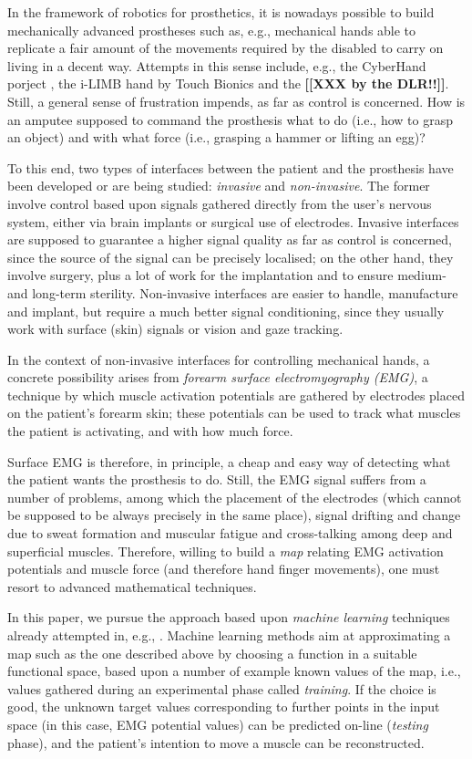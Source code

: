 In the framework of robotics for prosthetics, it is nowadays possible
to build mechanically advanced prostheses such as, e.g., mechanical
hands able to replicate a fair amount of the movements required by the
disabled to carry on living in a decent way. Attempts in this sense
include, e.g., the CyberHand porject \cite{...}, the i-LIMB hand by
Touch Bionics \cite{...} and the \textbf{[[XXX by the DLR!!]]}. Still,
a general sense of frustration impends, as far as control is
concerned. How is an amputee supposed to command the prosthesis what
to do (i.e., how to grasp an object) and with what force (i.e.,
grasping a hammer or lifting an egg)?

To this end, two types of interfaces between the patient and the
prosthesis have been developed or are being studied: \emph{invasive} and
\emph{non-invasive}. The former involve control based upon signals
gathered directly from the user's nervous system, either via brain
implants or surgical use of electrodes. Invasive interfaces are
supposed to guarantee a higher signal quality as far as control is
concerned, since the source of the signal can be precisely localised;
on the other hand, they involve surgery, plus a lot of work for the
implantation and to ensure medium- and long-term
sterility. Non-invasive interfaces are easier to handle, manufacture
and implant, but require a much better signal conditioning, since they
usually work with surface (skin) signals or vision and gaze
tracking.

In the context of non-invasive interfaces for controlling mechanical
hands, a concrete possibility arises from \emph{forearm surface
electromyography (EMG)}, a technique by which muscle activation
potentials are gathered by electrodes placed on the patient's forearm
skin; these potentials can be used to track what muscles the patient
is activating, and with how much force.

Surface EMG is therefore, in principle, a cheap and easy way of
detecting what the patient wants the prosthesis to do. Still, the EMG
signal suffers from a number of problems, among which the placement of
the electrodes (which cannot be supposed to be always precisely in the
same place), signal drifting and change due to sweat formation and
muscular fatigue and cross-talking among deep and superficial
muscles. Therefore, willing to build a \emph{map} relating EMG
activation potentials and muscle force (and therefore hand finger
movements), one must resort to advanced mathematical techniques.

In this paper, we pursue the approach based upon \emph{machine
learning} techniques already attempted in, e.g.,
\cite{...,smagt}. Machine learning methods aim at approximating a map
such as the one described above by choosing a function in a suitable
functional space, based upon a number of example known values of the
map, i.e., values gathered during an experimental phase called
\emph{training}. If the choice is good, the unknown target values
corresponding to further points in the input space (in this case, EMG
potential values) can be predicted on-line (\emph{testing} phase), and
the patient's intention to move a muscle can be reconstructed.

